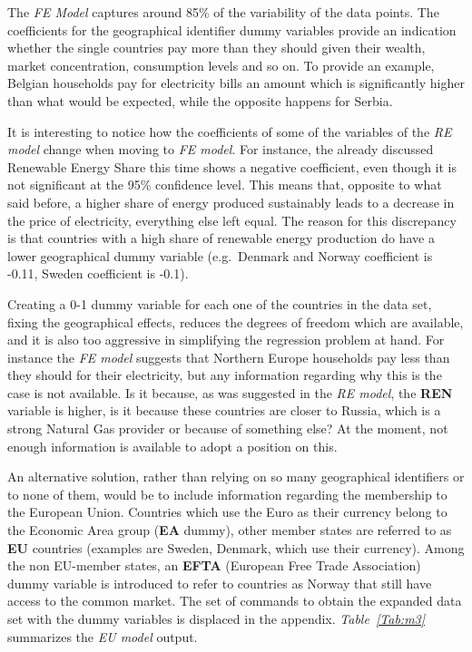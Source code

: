 \documentclass[a4paper,12pt]{book}
\begin{document}
The \textit{FE Model} captures around 85\% of the variability of the data points. The coefficients for the geographical identifier dummy variables provide an indication whether the single countries pay more than they should given their wealth, market concentration, consumption levels and so on. To provide an example, Belgian households pay for electricity bills an amount which is significantly higher than what would be expected, while the opposite happens for Serbia.

It is interesting to notice how the coefficients of some of the variables of the \textit{RE model} change when moving to \textit{FE model}. For instance, the already discussed Renewable Energy Share this time shows a negative coefficient, even though it is not significant at the 95\% confidence level. This means that, opposite to what said before, a higher share of energy produced sustainably leads to a decrease in the price of electricity, everything else left equal. The reason for this discrepancy is that countries with a high share of renewable energy production do have a lower geographical dummy variable (e.g.\ Denmark and Norway coefficient is -0.11, Sweden coefficient is -0.1).

Creating a 0-1 dummy variable for each one of the countries in the data set, fixing the geographical effects, reduces the degrees of freedom which are available, and it is also too aggressive in simplifying the regression problem at hand. For instance the \textit{FE model} suggests that Northern Europe households pay less than they should for their electricity, but any information regarding why this is the case is not available. Is it because, as was suggested in the \textit{RE model}, the \textbf{REN} variable is higher, is it because these countries are closer to Russia, which is a strong Natural Gas provider or because of something else? At the moment, not enough information is available to adopt a position on this.

An alternative solution, rather than relying on so many geographical identifiers or to none of them, would be to include information regarding the membership to the European Union. Countries which use the Euro as their currency belong to the Economic Area group (\textbf{EA} dummy), other member states are referred to as \textbf{EU} countries (examples are Sweden, Denmark, which use their currency). Among the non EU-member states, an \textbf{EFTA} (European Free Trade Association) dummy variable is introduced to refer to countries as Norway that still have access to the common market. The set of commands to obtain the expanded data set with the dummy variables is displaced in the appendix. \textit{Table~\ref{Tab:m3}} summarizes the \textit{EU model} output.
\end{document}
